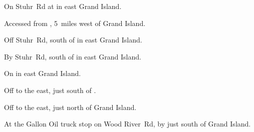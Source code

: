 
\begin{LocationList}

On Stuhr~Rd at  in east Grand Island.

Accessed from , 5~miles west of Grand Island.

Off Stuhr~Rd, south of  in east Grand Island.

By Stuhr~Rd, south of  in east Grand Island.

\Location{\GarageHQ \Garage}
On  in east Grand Island.

Off  to the east, just south of .

Off  to the east, just north of Grand Island.

At the Gallon Oil truck stop on Wood River~Rd, by  just south of Grand Island.

\end{LocationList}
